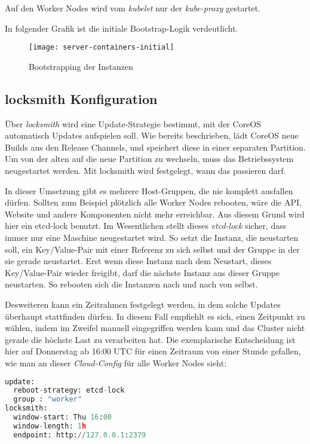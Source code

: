 Auf den Worker Nodes wird vom \emph{kubelet} nur der \emph{kube-proxy} gestartet.

In folgender Grafik ist die initiale Bootstrap-Logik verdeutlicht.

\begin{figure}[H]
\centering
\texttt{[image: server-containers-initial]}
\caption{Bootstrapping der Instanzen}
\end{figure}

\subsection{locksmith Konfiguration}

Über \emph{locksmith} wird eine Update-Strategie bestimmt, mit der
CoreOS automatisch Updates aufspielen soll.
Wie bereits beschrieben, lädt CoreOS neue Builds aus den Release Channels, und
speichert diese in einer separaten Partition. Um von der alten auf die neue
Partition zu wechseln,
muss das Betriebssystem neugestartet werden.
Mit locksmith wird festgelegt, wann das passieren darf.

In dieser Umsetzung gibt es mehrere Host-Gruppen, die
nie komplett ausfallen dürfen. Sollten zum Beispiel plötzlich alle Worker Nodes
rebooten,
wäre die API, Website und andere Komponenten nicht mehr erreichbar.
Aus diesem Grund wird hier ein etcd-lock benutzt. Im Wesentlichen stellt dieses
\emph{etcd-lock} sicher, dass immer nur eine Maschine neugestartet wird.
So setzt die Instanz, die neustarten soll, ein Key/Value-Pair
mit einer Referenz zu sich selbst und der Gruppe in der sie gerade neustartet.
Erst wenn diese Instanz nach dem Neustart, dieses Key/Value-Pair wieder
freigibt, darf
die nächste Instanz aus dieser Gruppe neustarten.
So rebooten sich die Instanzen nach und nach von selbst.

Desweiteren kann ein Zeitrahmen festgelegt werden, in dem solche Updates überhaupt
stattfinden dürfen. In diesem Fall empfiehlt es sich, einen Zeitpunkt zu
wählen,
indem im Zweifel manuell eingegriffen werden kann und das Cluster
nicht gerade die höchste Last zu verarbeiten hat.
Die exemplarische Entscheidung ist hier auf Donnerstag ab 16:00 UTC für einen
Zeitraum von einer Stunde gefallen,
wie man an dieser \emph{Cloud-Config} für alle Worker Nodes sieht:

\begin{lstlisting}[language=Python,numbers=none]
update:
  reboot-strategy: etcd-lock
  group : "worker"
locksmith:
  window-start: Thu 16:00
  window-length: 1h
  endpoint: http://127.0.0.1:2379\end{lstlisting}

